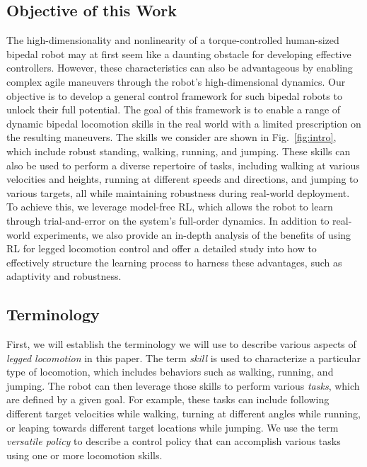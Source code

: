 \subsection{Objective of this Work}
The high-dimensionality and nonlinearity of a torque-controlled human-sized bipedal robot may at first seem like a daunting obstacle for developing effective controllers.
However, these characteristics can also be advantageous by enabling complex agile maneuvers through the robot's high-dimensional dynamics.
Our objective is to develop a general control framework for such bipedal robots to unlock their full potential. 
The goal of this framework is to enable a range of dynamic bipedal locomotion skills in the real world with a limited prescription on the resulting maneuvers. The skills we consider are shown in Fig.~\ref{fig:intro}, which include robust standing, walking, running, and jumping. These skills can also be used to perform a diverse repertoire of tasks, including walking at various velocities and heights, running at different speeds and directions, and jumping to various targets, all while maintaining robustness during real-world deployment.
To achieve this, we leverage model-free RL, which allows the robot to learn through trial-and-error on the system's full-order dynamics.
In addition to real-world experiments, we also provide an in-depth analysis of the benefits of using RL for legged locomotion control and offer a detailed study into how to effectively structure the learning process to harness these advantages, such as adaptivity and robustness. 





\subsection{Terminology}
First, we will establish the terminology we will use to describe various aspects of \emph{legged locomotion} in this paper. 
The term \textit{skill} is used to characterize a particular type of locomotion, which includes behaviors such as walking, running, and jumping. 
The robot can then leverage those skills to perform various \textit{tasks}, which are defined by a given goal. 
For example, these tasks can include following different target velocities while walking, turning at different angles while running, or leaping towards different target locations while jumping. We use the term \textit{versatile policy} to describe a control policy that can accomplish various tasks using one or more locomotion skills.

